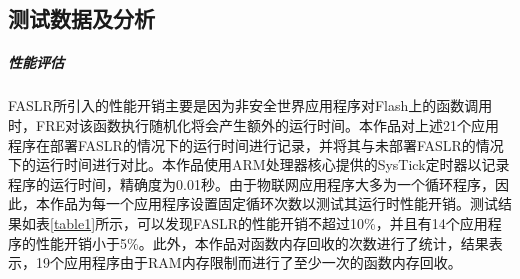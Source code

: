 \documentclass[UTF8,12pt,a4paper]{ctexart}
\numberwithin{figure}{section}
\begin{document}
\subsection{测试数据及分析}

\subparagraph{性能评估}
\par FASLR所引入的性能开销主要是因为非安全世界应用程序对Flash上的函数调用时，FRE对该函数执行随机化将会产生额外的运行时间。本作品对上述21个应用程序在部署FASLR的情况下的运行时间进行记录，并将其与未部署FASLR的情况下的运行时间进行对比。本作品使用ARM处理器核心提供的SysTick定时器以记录程序的运行时间，精确度为0.01秒。由于物联网应用程序大多为一个循环程序，因此，本作品为每一个应用程序设置固定循环次数以测试其运行时性能开销。测试结果如表\ref{table1}所示，可以发现FASLR的性能开销不超过10\%，并且有14个应用程序的性能开销小于5\%。此外，本作品对函数内存回收的次数进行了统计，结果表示，19个应用程序由于RAM内存限制而进行了至少一次的函数内存回收。
\end{document}
